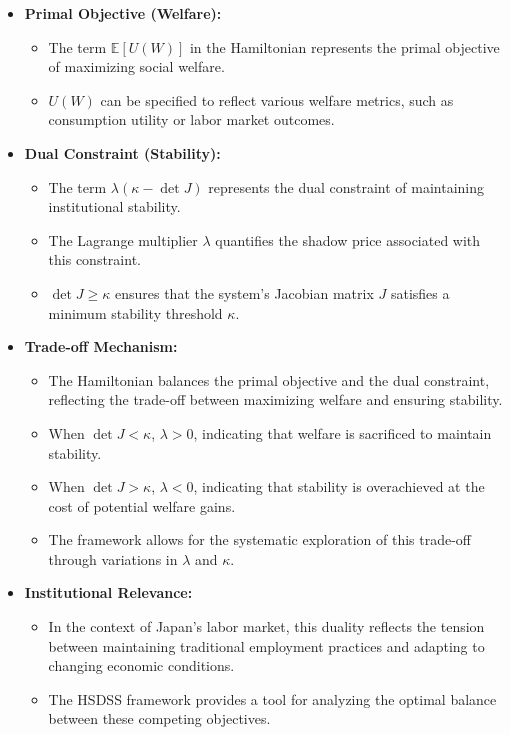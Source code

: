 \documentclass[10pt]{article}
\theoremstyle{definition}
\begin{document}
\begin{itemize}
    \item \textbf{Primal Objective (Welfare):}
        \begin{itemize}
            \item The term $\mathbb{E}[U(W)]$ in the Hamiltonian represents the primal objective of maximizing social welfare.
            \item $U(W)$ can be specified to reflect various welfare metrics, such as consumption utility or labor market outcomes.
        \end{itemize}
    \item \textbf{Dual Constraint (Stability):}
        \begin{itemize}
            \item The term $\lambda(\kappa - \det J)$ represents the dual constraint of maintaining institutional stability.
            \item The Lagrange multiplier $\lambda$ quantifies the shadow price associated with this constraint.
            \item $\det J \geq \kappa$ ensures that the system's Jacobian matrix $J$ satisfies a minimum stability threshold $\kappa$.
        \end{itemize}
    \item \textbf{Trade-off Mechanism:}
        \begin{itemize}
            \item The Hamiltonian balances the primal objective and the dual constraint, reflecting the trade-off between maximizing welfare and ensuring stability.
            \item When $\det J < \kappa$, $\lambda > 0$, indicating that welfare is sacrificed to maintain stability.
            \item When $\det J > \kappa$, $\lambda < 0$, indicating that stability is overachieved at the cost of potential welfare gains.
            \item The framework allows for the systematic exploration of this trade-off through variations in $\lambda$ and $\kappa$.
        \end{itemize}
    \item \textbf{Institutional Relevance:}
        \begin{itemize}
            \item In the context of Japan's labor market, this duality reflects the tension between maintaining traditional employment practices and adapting to changing economic conditions.
            \item The HSDSS framework provides a tool for analyzing the optimal balance between these competing objectives.
        \end{itemize}
\end{itemize}
\end{document}
